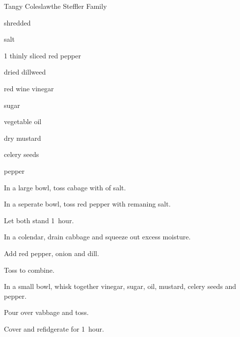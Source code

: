 \begin{recipe}{Tangy Coleslaw}{the Steffler Family}{}

\begin{ingredients}
\item {} shredded 
\item \tp{1\quarter} salt
\item 1 thinly sliced red pepper
\item {} dried dillweed
\item \C{\quarter} red wine vinegar
\item {} sugar
\item {} vegetable oil
\item {} dry mustard
\item \tp{\threequarter} celery seeds
\item \tp{\quarter} pepper
\end{ingredients}

\begin{directions}
\item In a large bowl, toss cabage with  of salt.
\item In a seperate bowl, toss red pepper with remaning salt.
\item Let both stand 1~hour.
\item In a colendar, drain cabbage and squeeze out excess moisture.
\item Add red pepper, onion and dill.
\item Toss to combine.
\item In a small bowl, whisk together vinegar, sugar, oil, mustard, celery seeds and pepper.
\item Pour over vabbage and toss.
\item Cover and refidgerate for 1~hour.
\end{directions}

\end{recipe}
